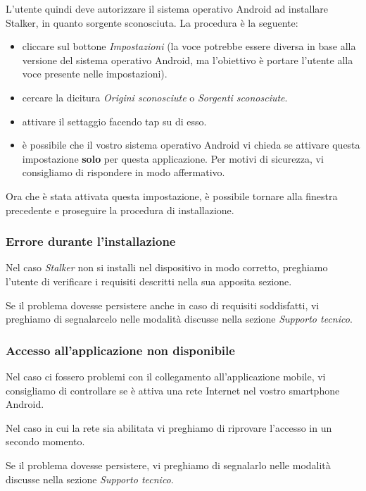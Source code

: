 \documentclass[../manuale-utente.tex]{subfiles}
\begin{document}
L'utente quindi deve autorizzare il sistema operativo Android ad installare Stalker, in quanto sorgente sconosciuta. La procedura è la seguente:
\begin{itemize}
    \item cliccare sul bottone \textit{Impostazioni} (la voce potrebbe essere diversa in base alla versione del sistema operativo Android, ma l'obiettivo è portare l'utente alla voce presente nelle impostazioni).
    \item cercare la dicitura \textit{Origini sconosciute} o \textit{Sorgenti sconosciute}.
    \item attivare il settaggio facendo tap su di esso.
    \item è possibile che il vostro sistema operativo Android vi chieda se attivare questa impostazione \textbf{solo} per questa applicazione. Per motivi di sicurezza, vi consigliamo di rispondere in modo affermativo.
\end{itemize}

Ora che è stata attivata questa impostazione, è possibile tornare alla finestra precedente e proseguire la procedura di installazione.

\subsubsection{Errore durante l'installazione}%
\label{subs:mobile_app_errore_installazione}

Nel caso \textit{Stalker} non si installi nel dispositivo in modo corretto, preghiamo l'utente di verificare i requisiti descritti nella sua apposita sezione.

Se il problema dovesse persistere anche in caso di requisiti soddisfatti, vi preghiamo di segnalarcelo nelle modalità discusse nella sezione \textit{Supporto tecnico}.

\subsubsection{Accesso all'applicazione non disponibile}%
\label{subs:mobile_app_accesso_non_disponibile}

Nel caso ci fossero problemi con il collegamento all'applicazione mobile, vi consigliamo di controllare se è attiva una rete Internet nel vostro smartphone Android.

Nel caso in cui la rete sia abilitata vi preghiamo di riprovare l'accesso in un secondo momento.

Se il problema dovesse persistere, vi preghiamo di segnalarlo nelle modalità discusse nella sezione \textit{Supporto tecnico}.
\end{document}

